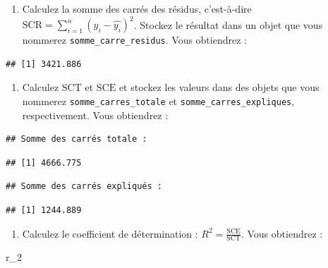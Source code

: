 \documentclass[
  11pt,
]{book}
\newenvironment{Shaded}{\begin{snugshade}}{\end{snugshade}}
\newcommand{\NormalTok}[1]{#1}
\providecommand{\tightlist}{%
  \setlength{\itemsep}{0pt}\setlength{\parskip}{0pt}}
\numberwithin{equation}{section}
\numberwithin{countremarque}{section}
\newenvironment{greenbox}{
  \begin{tcolorbox}[breakable, colback=vert,coltext=black,
                  colframe=grisfonce]}
 {\end{tcolorbox}}
\begin{document}
\begin{greenbox}

\begin{enumerate}
\def\labelenumi{\arabic{enumi}.}
\setcounter{enumi}{14}
\tightlist
\item
  Calculez la somme des carrés des résidus, c'est-à-dire \(\text{SCR} = \sum_{i=1}^{n} \left( y_i - \hat{y_i}\right)^2\). Stockez le résultat dans un objet que vous nommerez \texttt{somme\_carre\_residus}. Vous obtiendrez :
\end{enumerate}

\begin{lstlisting}
## [1] 3421.886
\end{lstlisting}

\begin{enumerate}
\def\labelenumi{\arabic{enumi}.}
\setcounter{enumi}{15}
\tightlist
\item
  Calculez \(\text{SCT}\) et \(\text{SCE}\) et stockez les valeurs dans des objets que vous nommerez \texttt{somme\_carres\_totale} et \texttt{somme\_carres\_expliques}, respectivement. Vous obtiendrez :
\end{enumerate}

\begin{lstlisting}
## Somme des carrés totale :
\end{lstlisting}

\begin{lstlisting}
## [1] 4666.775
\end{lstlisting}

\begin{lstlisting}
## Somme des carrés expliqués :
\end{lstlisting}

\begin{lstlisting}
## [1] 1244.889
\end{lstlisting}

\begin{enumerate}
\def\labelenumi{\arabic{enumi}.}
\setcounter{enumi}{16}
\tightlist
\item
  Calculez le coefficient de détermination : \(R^2 = \frac{\text{SCE}}{\text{SCT}}\). Vous obtiendrez :
\end{enumerate}

\begin{Shaded}
\begin{Highlighting}[]
\NormalTok{r\_2}
\end{Highlighting}
\end{Shaded}

\end{greenbox}
\end{document}
